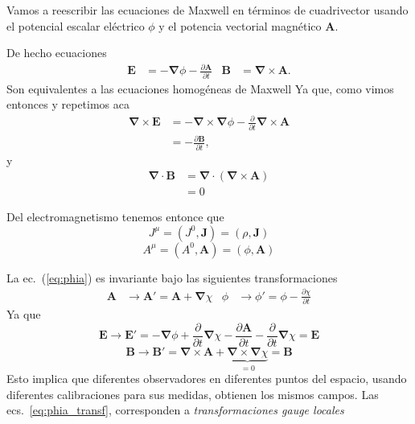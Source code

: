 Vamos a  reescribir las ecuaciones de Maxwell en términos de cuadrivector usando el potencial escalar el\'ectrico $\phi$ y el potencia vectorial magn\'etico $\mathbf{A}$.

De hecho ecuaciones   \label{eq:phia} 
\begin{align}
  \label{eq:phia}
  \mathbf{E}&=-\boldsymbol{\nabla}\phi-\frac{\partial\mathbf{A}}{\partial t}&
  \mathbf{B}&=\boldsymbol{\nabla}\times\mathbf{A}.
\end{align}
 Son equivalentes a las ecuaciones homog\'eneas de Maxwell Ya que, como vimos entonces y repetimos aca
\begin{align*}
  \boldsymbol{\nabla}\times\mathbf{E}&=-\boldsymbol{\nabla}\times\boldsymbol{\nabla}\phi-\frac{\partial}{\partial t}\boldsymbol{\nabla}\times\mathbf{A}\\
  &=-\frac{\partial\mathbf{B}}{\partial t},
\end{align*}
y
\begin{align*}
  \boldsymbol{\nabla}\cdot\mathbf{B}&=\boldsymbol{\nabla}\cdot(\boldsymbol{\nabla}\times\mathbf{A})\\
  &=0
\end{align*}


\begin{frame}
Del electromagnetismo tenemos entonce que
\begin{equation}
  \label{eq:cv_jmu}
  J^\mu=(J^0,\mathbf{J})=(\rho,\mathbf{J})
\end{equation}
\begin{equation}
  \label{eq:cv_phia}
  A^\mu=(A^0,\mathbf{A})=(\phi,\mathbf{A})
\end{equation}
\end{frame}

La ec.~(\ref{eq:phia}) es invariante bajo las siguientes transformaciones
\begin{align}
  \label{eq:phia_transf}
  \mathbf{A}&\to\mathbf{A}'=\mathbf{A}+\boldsymbol{\nabla}\chi&
  \phi&\to\phi'=\phi-\frac{\partial\chi}{\partial t} 
\end{align}
Ya que
\begin{equation}
  \label{eq:Etrans}
  \mathbf{E}\to\mathbf{E}'= -\boldsymbol{\nabla}\phi+\frac{\partial}{\partial t}\boldsymbol{\nabla}\chi
  -\frac{\partial\mathbf{A}}{\partial t}-\frac{\partial}{\partial t}\boldsymbol{\nabla}\chi=\mathbf{E}
\end{equation}
\begin{equation}
  \label{eq:btransf}
  \mathbf{B}\to\mathbf{B}'= \boldsymbol{\nabla}\times\mathbf{A}+
  \underbrace{\boldsymbol{\nabla}\times\boldsymbol{\nabla}\chi}_{\displaystyle =0}=\mathbf{B}
\end{equation}
Esto implica que diferentes observadores en diferentes puntos del espacio, usando diferentes calibraciones para sus medidas, obtienen los mismos campos. Las  ecs.~\eqref{eq:phia_transf}, corresponden a \emph{transformaciones gauge locales}

